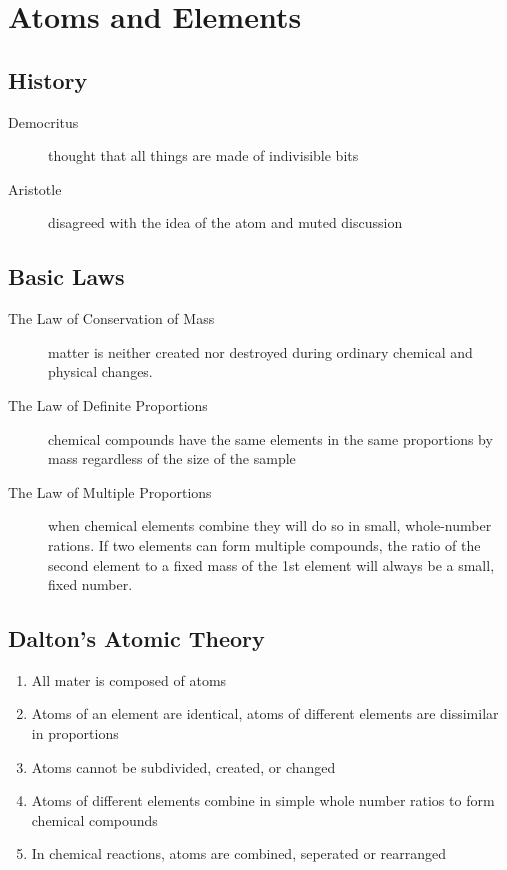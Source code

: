 \chapter{Atoms and Elements}

\section{History}
\begin{description}
  \item[Democritus] thought that all things are made of indivisible bits
  \item[Aristotle] disagreed with the idea of the atom and muted discussion
\end{description}

\section{Basic Laws}
\begin{description}
  \item[The Law of Conservation of Mass] matter is neither created nor destroyed
    during ordinary chemical and physical changes.
  \item[The Law of Definite Proportions] chemical compounds have the same
    elements in the same proportions by mass regardless of the size of the
    sample
  \item[The Law of Multiple Proportions] when chemical elements combine they
    will do so in small, whole-number rations.  If two elements can form
    multiple compounds, the ratio of the second element to a fixed mass of the
    1st element will always be a small, fixed number.
\end{description}

\section{Dalton's Atomic Theory}
\begin{enumerate}
  \item All mater is composed of atoms
  \item Atoms of an element are identical, atoms of different elements are
    dissimilar in proportions
  \item Atoms cannot be subdivided, created, or changed
  \item Atoms of different elements combine in simple whole number ratios to
    form chemical compounds
  \item In chemical reactions, atoms are combined, seperated or rearranged
\end{enumerate}


